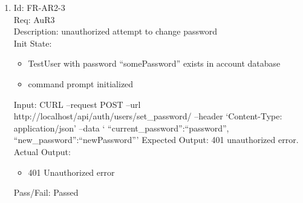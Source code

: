 \documentclass[12pt, titlepage]{article}
\begin{document}
\begin{enumerate}
    \item Id: FR-AR2-3\\
    Req: AuR3\\
    Description: unauthorized attempt to change password\\
    Init State: \begin{itemize}[noitemsep,topsep=0pt]
        \item TestUser with password ``somePassword'' exists in account database
        \item command prompt initialized
    \end{itemize}
    Input: CURL --request POST --url http://localhost/api/auth/users/set\_password/ --header `Content-Type: application/json' --data `{
	``current\_password'':``password'',
	``new\_password'':``newPassword''}'
    Expected Output: 401 unauthorized error.\\ 
    Actual Output: \begin{itemize}[noitemsep,topsep=0pt]
        \item 401 Unauthorized error
    \end{itemize}
    Pass/Fail: Passed
\end{enumerate}
\end{document}
